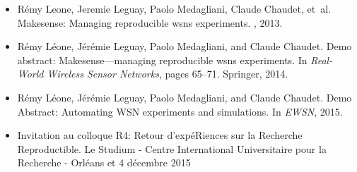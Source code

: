 \begin{itemize}
  \item Rémy Leone, Jeremie Leguay, Paolo Medagliani, Claude Chaudet, et~al.
\newblock Makesense: Managing reproducible wsns experiments.
, 2013.

  \item Rémy Léone, Jérémie Leguay, Paolo Medagliani, and Claude
  Chaudet.
\newblock Demo abstract: Makesense—managing reproducible wsns experiments.
\newblock In {\em Real-World Wireless Sensor Networks}, pages 65--71. Springer,
  2014.

  \item Rémy Léone, Jérémie Leguay, Paolo Medagliani, and Claude
  Chaudet.
\newblock Demo Abstract: Automating WSN experiments and simulations.
\newblock In {\em EWSN}, 2015.

  \item Invitation au colloque R4: Retour d'expéRiences sur la Recherche Reproductible.
  \newblock Le Studium - Centre International Universitaire pour la Recherche - Orléans
   et 4 décembre 2015 

\end{itemize}
